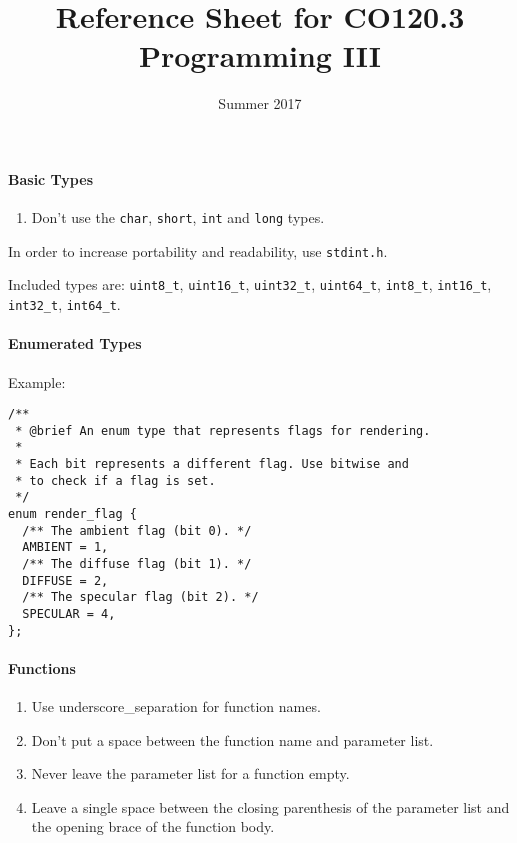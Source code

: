 \documentclass[twocolumn,english]{article}
\begin{document}
\title{Reference Sheet for CO120.3 Programming III}


\date{Summer 2017}

\maketitle

\paragraph{Basic Types}\label{basic-types}

\begin{enumerate}
\def\labelenumi{\arabic{enumi}.}

\item
  Don't use the \texttt{char}, \texttt{short}, \texttt{int} and
  \texttt{long} types.
\end{enumerate}

In order to increase portability and readability, use \texttt{stdint.h}.

Included types are: \texttt{uint8\_t}, \texttt{uint16\_t},
\texttt{uint32\_t}, \texttt{uint64\_t}, \texttt{int8\_t},
\texttt{int16\_t}, \texttt{int32\_t}, \texttt{int64\_t}.

\paragraph{Enumerated Types}\label{enumerated-types}

Example:

\begin{verbatim}
/**
 * @brief An enum type that represents flags for rendering.
 *
 * Each bit represents a different flag. Use bitwise and 
 * to check if a flag is set.
 */
enum render_flag {
  /** The ambient flag (bit 0). */
  AMBIENT = 1,
  /** The diffuse flag (bit 1). */
  DIFFUSE = 2,
  /** The specular flag (bit 2). */
  SPECULAR = 4,
};
\end{verbatim}

\paragraph{Functions}\label{functions}

\begin{enumerate}
\def\labelenumi{\arabic{enumi}.}

\item
  Use underscore\_separation for function names.
\item
  Don't put a space between the function name and parameter list.
\item
  Never leave the parameter list for a function empty.
\item
  Leave a single space between the closing parenthesis of the parameter
  list and the opening brace of the function body.
\end{enumerate}
\end{document}
